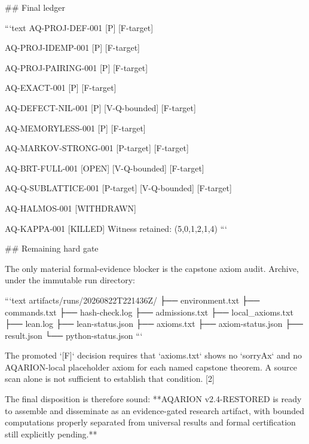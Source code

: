 ## Final ledger

```text
AQ-PROJ-DEF-001
[P] [F-target]

AQ-PROJ-IDEMP-001
[P] [F-target]

AQ-PROJ-PAIRING-001
[P] [F-target]

AQ-EXACT-001
[P] [F-target]

AQ-DEFECT-NIL-001
[P] [V-Q-bounded] [F-target]

AQ-MEMORYLESS-001
[P] [F-target]

AQ-MARKOV-STRONG-001
[P-target] [F-target]

AQ-BRT-FULL-001
[OPEN] [V-Q-bounded] [F-target]

AQ-Q-SUBLATTICE-001
[P-target] [V-Q-bounded] [F-target]

AQ-HALMOS-001
[WITHDRAWN]

AQ-KAPPA-001
[KILLED]
Witness retained: (5,0,1,2,1,4)
```

## Remaining hard gate

The only material formal-evidence blocker is the capstone axiom audit. Archive, under the immutable run directory:

```text
artifacts/runs/20260822T221436Z/
├── environment.txt
├── commands.txt
├── hash-check.log
├── admissions.txt
├── local_axioms.txt
├── lean.log
├── lean-status.json
├── axioms.txt
├── axiom-status.json
├── result.json
└── python-status.json
```

The promoted `[F]` decision requires that `axioms.txt` shows no `sorryAx` and no AQARION-local placeholder axiom for each named capstone theorem. A source scan alone is not sufficient to establish that condition. [2]

The final disposition is therefore sound: **AQARION v2.4-RESTORED is ready to assemble and disseminate as an evidence-gated research artifact, with bounded computations properly separated from universal results and formal certification still explicitly pending.**

